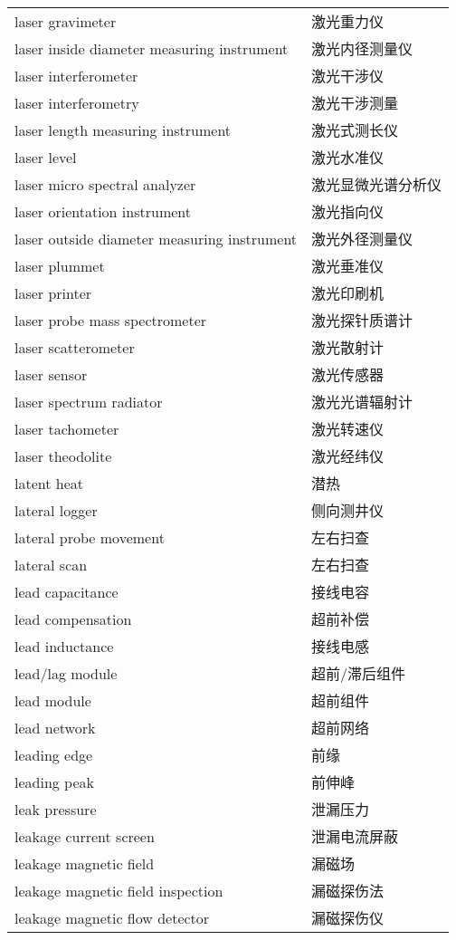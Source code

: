 \documentclass[
]{article}
\begin{document}
\begin{longtable}[]{@{}ll@{}}
laser gravimeter & 激光重力仪 \\
laser inside diameter measuring instrument & 激光内径测量仪 \\
laser interferometer & 激光干涉仪 \\
laser interferometry & 激光干涉测量 \\
laser length measuring instrument & 激光式测长仪 \\
laser level & 激光水准仪 \\
laser micro spectral analyzer & 激光显微光谱分析仪 \\
laser orientation instrument & 激光指向仪 \\
laser outside diameter measuring instrument & 激光外径测量仪 \\
laser plummet & 激光垂准仪 \\
laser printer & 激光印刷机 \\
laser probe mass spectrometer & 激光探针质谱计 \\
laser scatterometer & 激光散射计 \\
laser sensor & 激光传感器 \\
laser spectrum radiator & 激光光谱辐射计 \\
laser tachometer & 激光转速仪 \\
laser theodolite & 激光经纬仪 \\
latent heat & 潜热 \\
lateral logger & 侧向测井仪 \\
lateral probe movement & 左右扫查 \\
lateral scan & 左右扫查 \\
lead capacitance & 接线电容 \\
lead compensation & 超前补偿 \\
lead inductance & 接线电感 \\
lead/lag module & 超前/滞后组件 \\
lead module & 超前组件 \\
lead network & 超前网络 \\
leading edge & 前缘 \\
leading peak & 前伸峰 \\
leak pressure & 泄漏压力 \\
leakage current screen & 泄漏电流屏蔽 \\
leakage magnetic field & 漏磁场 \\
leakage magnetic field inspection & 漏磁探伤法 \\
leakage magnetic flow detector & 漏磁探伤仪 \\

\end{longtable}
\end{document}
